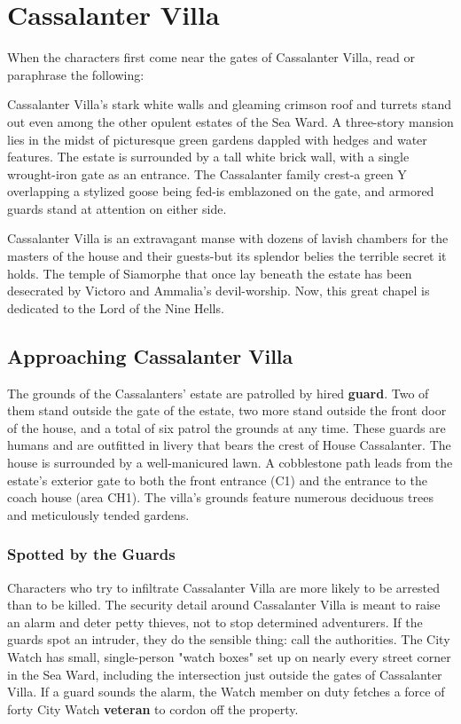 \documentclass[10pt,a4paper,twoside,twocolumn,openany,nodeprecatedcode]{dndbook}
\begin{document}
\section{Cassalanter Villa}
When the characters first come near the gates of Cassalanter Villa, read or paraphrase the following:
\begin{DndReadAloud}{}
Cassalanter Villa's stark white walls and gleaming crimson roof and turrets stand out even among the other opulent estates of the Sea Ward. A three-story mansion lies in the midst of picturesque green gardens dappled with hedges and water features. The estate is surrounded by a tall white brick wall, with a single wrought-iron gate as an entrance. The Cassalanter family crest-a green Y overlapping a stylized goose being fed-is emblazoned on the gate, and armored guards stand at attention on either side.
\end{DndReadAloud}

Cassalanter Villa is an extravagant manse with dozens of lavish chambers for the masters of the house and their guests-but its splendor belies the terrible secret it holds. The temple of Siamorphe that once lay beneath the estate has been desecrated by Victoro and Ammalia's devil-worship. Now, this great chapel is dedicated to the Lord of the Nine Hells.
\subsection{Approaching Cassalanter Villa}
The grounds of the Cassalanters' estate are patrolled by hired \textbf{guard}. Two of them stand outside the gate of the estate, two more stand outside the front door of the house, and a total of six patrol the grounds at any time. These guards are humans and are outfitted in livery that bears the crest of House Cassalanter.
The house is surrounded by a well-manicured lawn. A cobblestone path leads from the estate's exterior gate to both the front entrance (C1) and the entrance to the coach house (area CH1). The villa's grounds feature numerous deciduous trees and meticulously tended gardens.
\subsubsection{Spotted by the Guards}
Characters who try to infiltrate Cassalanter Villa are more likely to be arrested than to be killed. The security detail around Cassalanter Villa is meant to raise an alarm and deter petty thieves, not to stop determined adventurers. If the guards spot an intruder, they do the sensible thing: call the authorities.
The City Watch has small, single-person "watch boxes" set up on nearly every street corner in the Sea Ward, including the intersection just outside the gates of Cassalanter Villa. If a guard sounds the alarm, the Watch member on duty fetches a force of forty City Watch \textbf{veteran} to cordon off the property.
\end{document}
